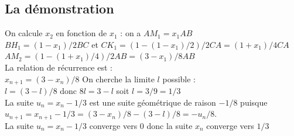 \documentclass[a4paper,11pt]{book}
\begin{document}
\subsection{La d\'emonstration}
On calcule $x_2$ en fonction de $x_1$ :
on a $AM_1=x_1AB$\\
$BH_1=(1-x_1)/2BC$ et $CK_1=(1-(1-x_1)/2)/2CA=(1+x_1)/4CA$\\
$AM_2=(1-(1+x_1)/4)/2AB=(3-x_1)/8AB$\\
La relation de r\'ecurrence est :\\
$x_{n+1}=(3-x_n)/8$
On cherche la limite $l$ possible :\\
$l=(3-l)/8$ donc $8l=3-l$ soit $l=3/9=1/3$\\
La suite $u_n=x_n-1/3$ est une suite g\'eom\'etrique de raison $-1/8$
puisque $u_{n+1}=x_{n+1}-1/3=(3-x_n)/8-(3-l)/8=-u_n/8$.\\
La suite $u_n=x_n-1/3$ converge vers 0 donc la suite $x_n$ converge vers $1/3$
\end{document}
